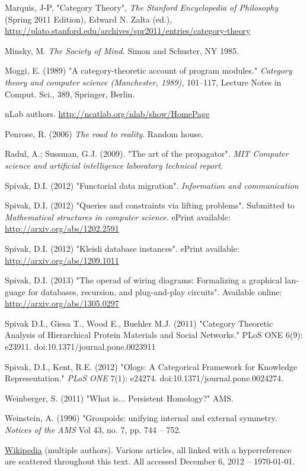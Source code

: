 \documentclass{book}
\theoremstyle{theoremENG}
\theoremstyle{lemmaENG}
\theoremstyle{propositionENG}
\theoremstyle{corollaryENG}
\theoremstyle{factENG}
\theoremstyle{remarkENG}
\theoremstyle{exampleENG}
\theoremstyle{warningENG}
\theoremstyle{questionENG}
\theoremstyle{guessENG}
\theoremstyle{answerENG}
\theoremstyle{constructionENG}
\theoremstyle{rulesENG}
\theoremstyle{excENG}
\theoremstyle{appENG}
\theoremstyle{definitionENG}
\theoremstyle{notationENG}
\theoremstyle{conjectureENG}
\theoremstyle{postulateENG}
\theoremstyle{theoremRUS}
\theoremstyle{lemmaRUS}
\theoremstyle{propositionRUS}
\theoremstyle{corollaryRUS}
\theoremstyle{factRUS}
\theoremstyle{remarkRUS}
\theoremstyle{exampleRUS}
\theoremstyle{warningRUS}
\theoremstyle{questionRUS}
\theoremstyle{guessRUS}
\theoremstyle{answerRUS}
\theoremstyle{constructionRUS}
\theoremstyle{rulesRUS}
\theoremstyle{excRUS}
\theoremstyle{appRUS}
\theoremstyle{definitionRUS}
\theoremstyle{notationRUS}
\theoremstyle{conjectureRUS}
\theoremstyle{postulateRUS}
\begin{document}
\begin{english}
\begin{thebibliography}{SGWB}
 Marquis, J-P, "Category Theory", {\em The Stanford Encyclopedia of Philosophy} (Spring 2011 Edition), Edward N. Zalta (ed.), \url{http://plato.stanford.edu/archives/spr2011/entries/category-theory}

 Minsky, M. {\em The Society of Mind.}  Simon and Schuster, NY 1985.

 Moggi, E. (1989) "A category-theoretic account of program modules." {\em Category theory and computer science (Manchester, 1989),} 101–117, Lecture Notes in Comput. Sci., 389, Springer, Berlin. 

 nLab authors.  \url{http://ncatlab.org/nlab/show/HomePage}

 Penrose, R. (2006) {\em The road to reality}. Random house.

 Radul, A.; Sussman, G.J. (2009). "The art of the propagator". {\em MIT Computer science and artificial intelligence laboratory technical report.}

 Spivak, D.I. (2012) "Functorial data migration". {\em Information and communication} 

 Spivak, D.I. (2012) "Queries and constraints via lifting problems". Submitted to {\em Mathematical structures in computer science}. ePrint available: \url{http://arxiv.org/abs/1202.2591}

 Spivak, D.I. (2012) "Kleisli database instances". ePrint available: \url{http://arxiv.org/abs/1209.1011}

 Spivak, D.I. (2013) "The operad of wiring diagrams: Formalizing a graphical language for databases, recursion, and plug-and-play circuits". Available online: \url{http://arxiv.org/abs/1305.0297}

 Spivak D.I., Giesa T., Wood E., Buehler M.J. (2011) "Category Theoretic Analysis of Hierarchical Protein Materials and Social Networks." PLoS ONE 6(9): e23911. doi:10.1371/journal.pone.0023911

 Spivak, D.I., Kent, R.E. (2012) "Ologs: A Categorical Framework for Knowledge Representation." {\em PLoS ONE} 7(1): e24274. doi:10.1371/journal.pone.0024274.

 Weinberger, S. (2011) "What is... Persistent Homology?" AMS.

 Weinstein, A. (1996) "Groupoids: unifying internal and external symmetry. {\em Notices of the AMS} Vol 43, no. 7, pp. 744 -- 752.

 \href{http://www.wikipedia.org}{\text Wikipedia} (multiple authors). Various articles, all linked with a hyperreference are scattered throughout this text. All accessed December 6, 2012 -- \today.

\end{thebibliography}

\end{english}
\end{document}
